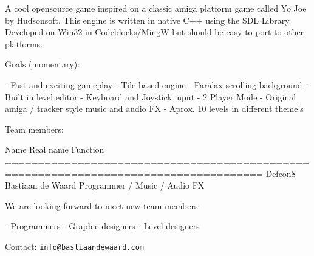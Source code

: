 A cool opensource game inspired on a classic amiga platform game called Yo Joe by Hudsonsoft. This engine is written in native C++ using the S\-D\-L Library. Developed on Win32 in Codeblocks/\-Ming\-W but should be easy to port to other platforms.

Goals (momentary)\-: \begin{DoxyVerb}- Fast and exciting gameplay
- Tile based engine
- Paralax scrolling background
- Built in level editor
- Keyboard and Joystick input
- 2 Player Mode
- Original amiga / tracker style music and audio FX
- Aprox. 10 levels in different theme's
\end{DoxyVerb}


Team members\-: \begin{DoxyVerb}Name            Real name           Function
=====================================================================================
Defcon8         Bastiaan de Waard   Programmer / Music / Audio FX
\end{DoxyVerb}


We are looking forward to meet new team members\-: \begin{DoxyVerb}- Programmers
- Graphic designers
- Level designers
\end{DoxyVerb}


Contact\-: \href{mailto:info@bastiaandewaard.com}{\tt info@bastiaandewaard.\-com} 